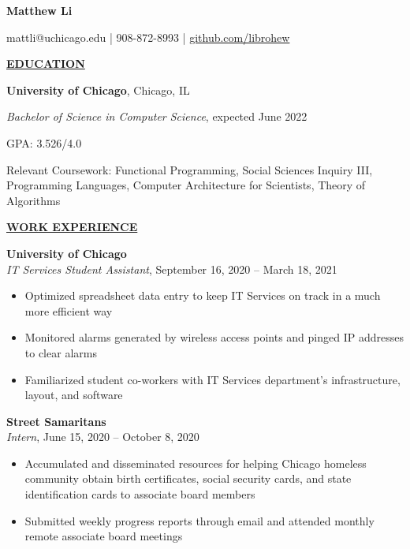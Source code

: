 \documentclass[
]{article}
\author{}
\date{\vspace{-2.5em}}
\providecommand{\tightlist}{%
  \setlength{\itemsep}{0pt}\setlength{\parskip}{0pt}}
\begin{document}

\begin{center}

\textbf{Matthew Li}

\end{center}

\begin{center}
mattli@uchicago.edu | 908-872-8993 | \href{https://www.github.com/librohew}{github.com/librohew}   
\end{center}

\textbf{\underline{EDUCATION}}

\textbf{University of Chicago}, Chicago, IL

\emph{Bachelor of Science in Computer Science}, expected June 2022

GPA: 3.526/4.0

Relevant Coursework: Functional Programming, Social Sciences Inquiry
III, Programming Languages, Computer Architecture for Scientists, Theory
of Algorithms

\textbf{\underline{WORK EXPERIENCE}}

\textbf{University of Chicago}\\
\emph{IT Services Student Assistant}, September 16, 2020 -- March 18,
2021

\begin{itemize}
\tightlist
\item
  Optimized spreadsheet data entry to keep IT Services on track in a
  much more efficient way
\end{itemize}

\begin{itemize}
\item
  Monitored alarms generated by wireless access points and pinged IP
  addresses to clear alarms
\item
  Familiarized student co-workers with IT Services department's
  infrastructure, layout, and software
\end{itemize}

\textbf{Street Samaritans}\\
\emph{Intern}, June 15, 2020 -- October 8, 2020

\begin{itemize}
\item
  Accumulated and disseminated resources for helping Chicago homeless
  community obtain birth certificates, social security cards, and state
  identification cards to associate board members
\item
  Submitted weekly progress reports through email and attended monthly
  remote associate board meetings
\end{itemize}
\end{document}
